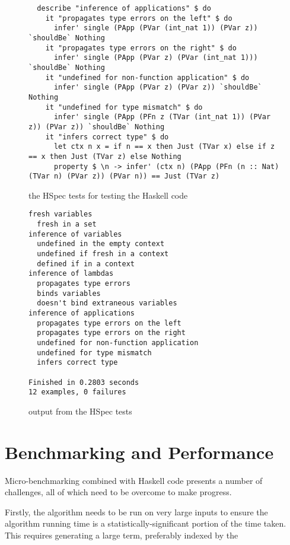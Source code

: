 \begin{figure}
\begin{verbatim}
  describe "inference of applications" $ do
    it "propagates type errors on the left" $ do
      infer' single (PApp (PVar (int_nat 1)) (PVar z)) `shouldBe` Nothing
    it "propagates type errors on the right" $ do
      infer' single (PApp (PVar z) (PVar (int_nat 1))) `shouldBe` Nothing
    it "undefined for non-function application" $ do
      infer' single (PApp (PVar z) (PVar z)) `shouldBe` Nothing
    it "undefined for type mismatch" $ do
      infer' single (PApp (PFn z (TVar (int_nat 1)) (PVar z)) (PVar z)) `shouldBe` Nothing
    it "infers correct type" $ do
      let ctx n x = if n == x then Just (TVar x) else if z == x then Just (TVar z) else Nothing
      property $ \n -> infer' (ctx n) (PApp (PFn (n :: Nat) (TVar n) (PVar z)) (PVar n)) == Just (TVar z)
\end{verbatim}
\caption{the HSpec tests for testing the Haskell code}
\label{fig:hspec-tests}
\end{figure}

\begin{figure}
\centering
\begin{verbatim}
fresh variables
  fresh in a set
inference of variables
  undefined in the empty context
  undefined if fresh in a context
  defined if in a context
inference of lambdas
  propagates type errors
  binds variables
  doesn't bind extraneous variables
inference of applications
  propagates type errors on the left
  propagates type errors on the right
  undefined for non-function application
  undefined for type mismatch
  infers correct type

Finished in 0.2803 seconds
12 examples, 0 failures
\end{verbatim}
\caption{output from the HSpec tests}
\label{fig:tests-output}
\end{figure}

\section{Benchmarking and Performance}
Micro-benchmarking combined with Haskell code presents a number of challenges, all of which need to be overcome to make progress.

Firstly, the algorithm needs to be run on very large inputs to ensure the algorithm running time is a statistically-significant portion of the time taken.
This requires generating a large term, preferably indexed by the 

